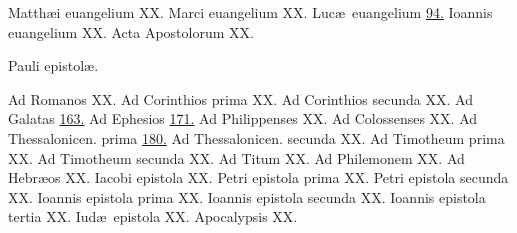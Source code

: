 \documentclass[a5paper,10pt]{book}
\def\ae{æ}
\begin{document}
\begin{multicols}{2}
\par \noindent Matth\ae i euangelium \hfill XX.
\newline Marci euangelium \hfill XX.
\newline Luc\ae \ euangelium \hfill \hyperlink{page.94}{94.}
\newline Ioannis euangelium \hfill XX.
\newline Acta Apostolorum \hfill XX.
\newline \vspace{-1.75em}
\begin{center}
\color{red} Pauli epistol\ae .
\end{center}
\vspace{-.75em}
\par\noindent Ad Romanos \hfill XX.
\newline Ad Corinthios prima \hfill XX.
\newline Ad Corinthios secunda \hfill XX.
\newline Ad Galatas \hfill \hyperlink{page.163}{163.}
\newline Ad Ephesios \hfill \hyperlink{page.171}{171.}
\newline Ad Philippenses \hfill XX.
\newline Ad Colossenses \hfill XX.
\newline Ad Thessalonicen. prima \hfill \hyperlink{page.180}{180.}
\newline Ad Thessalonicen. secunda \hfill XX.
\newline Ad Timotheum prima \hfill XX.
\newline Ad Timotheum secunda \hfill XX.
\newline Ad Titum \hfill XX.
\newline Ad Philemonem \hfill XX.
\newline Ad Hebr\ae os \hfill XX.
\newline Iacobi epistola \hfill XX.
\newline Petri epistola prima \hfill XX.
\newline Petri epistola secunda \hfill XX.
\newline Ioannis epistola prima \hfill XX.
\newline Ioannis epistola secunda \hfill XX.
\newline Ioannis epistola tertia \hfill XX.
\newline Iud\ae \ epistola \hfill XX.
\newline Apocalypsis \hfill XX.
\end{multicols}
\end{document}
